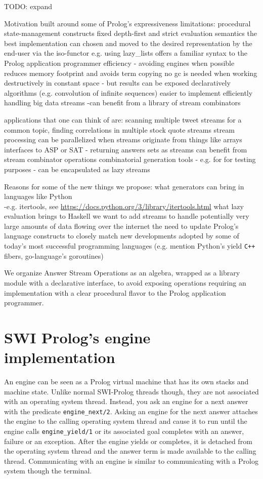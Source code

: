 \documentclass{new_tlp}
\begin{document}
{\Large TODO: expand}

Motivation built around some of Prolog's expressiveness limitations:
\BI
\I procedural state-management constructs
\I fixed depth-first and strict evaluation semantics
\I the best implementation can chosen and moved to the desired representation by the end-user via the iso-functor
e.g. using lazy\_lists offers a familiar syntax to the Prolog application programmer
\I efficiency - avoiding engines when possible reduces memory footprint and avoids term copying
\I no gc is needed when working destructively in constant space - but results can be exposed declaratively
\I algorithms (e.g. convolution of infinite sequences) easier to implement efficiently
\I handling big data streams -can benefit from a library of stream combinators


\I  applications that one can think of are:
\BI
\I scanning multiple tweet streams for a common topic, 
\I finding correlations in multiple stock quote streams 
\I stream processing  can be parallelized when streams originate from things like arrays
\I interfaces to ASP or SAT - returning answers sets as streams can benefit from stream combinator operations
\I combinatorial generation tools - e.g. for for testing purposes - can be encapsulated as lazy streams
\EI
\EI

Reasons for some of the new things we propose:
\BI
\I what generators can bring in languages like Python \\-e.g. itertools, 
see \url{https://docs.python.org/3/library/itertools.html}
\I what lazy evaluation brings to Haskell
\I we want to add streams to
handle potentially very large amounts of data flowing over the internet
\I the need to update Prolog's language constructs to closely match new developments adopted by some of today's most successful programming languages (e.g. mention Python's yield \verb~C++~ fibers, go-language's goroutines)
\EI

We organize Answer Stream Operations as an algebra, wrapped as a library module with a declarative interface, to avoid exposing  operations requiring an implementation with a clear procedural flavor to the Prolog application programmer.

\section{SWI Prolog's engine implementation}

An engine can be seen as a Prolog virtual machine that has its own stacks and machine state. Unlike normal SWI-Prolog threads \cite{swi,swi_threads} though, they are not associated with an operating system thread. Instead, you ask an engine for a next answer with the predicate {\tt engine\_next/2}. Asking an engine for the next answer attaches the engine to the calling operating system thread and cause it to run until the engine calls {\tt engine\_yield/1} or its associated goal completes with an answer, failure or an exception. After the engine yields or completes, it is detached from the operating system thread and the answer term is made available to the calling thread. Communicating with an engine is similar to communicating with a Prolog system though the terminal.
\end{document}
